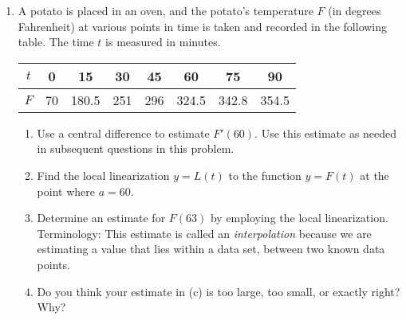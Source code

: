 \documentclass[11pt,letterpaper]{article}
\begin{document}
\begin{enumerate}
	\item A potato is placed in an oven, and the potato's temperature $F$ (in degrees Fahrenheit) at various points in time is taken and recorded in the following table. The time $t$ is measured in minutes. 
	\begin{center}
		\begin{tabular}{c||c|c|c|c|c|c|c}
		$t$ & 0 & 15 & 30 & 45 & 60 & 75 & 90 \\ \hline
		$F$ & 70 & 180.5 & 251 & 296 & 324.5 & 342.8 & 354.5 
		\end{tabular}
	\end{center}
	\begin{enumerate}
		\item Use a central difference to estimate $F'(60)$. Use this estimate as needed in subsequent questions in this problem. 
		\item Find the local linearization $y = L(t)$ to the function $y = F(t)$ at the point where $a = 60$. 
		\item Determine an estimate for $F(63)$ by employing the local linearization. Terminology: This estimate is called an \emph{interpolation} because we are estimating a value that lies within a data set, between two known data points. 
		\item Do you think your estimate in (c) is too large, too small, or exactly right? Why? 
	\end{enumerate}



\end{enumerate}
\end{document}
